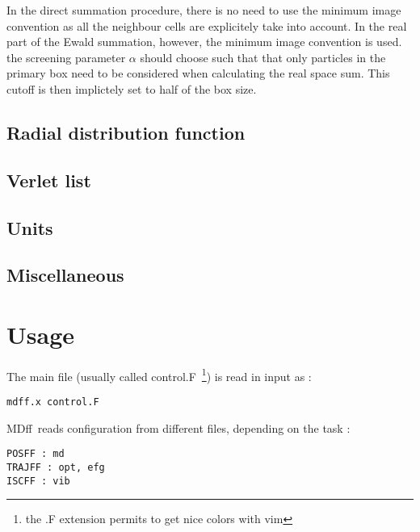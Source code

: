 \documentclass[a4paper]{article}
\newcommand{\MDFF}{{\sc MDff}}
\begin{document}
In the direct summation procedure, there is no need to use the minimum
 image convention as all the neighbour cells are explicitely take into account.
In the real part of the Ewald summation, however, the minimum image convention
is used. the screening parameter $\alpha$ should choose such that that only particles
in the primary box need to be considered when calculating the real space sum.
This cutoff is then implictely set to half of the box size.


\subsection{Radial distribution function\label{sec:GR}}

\subsection{Verlet list\label{sec:vnlist}}

\subsection{Units \label{sec:units}}

\subsection{Miscellaneous \label{sec:misc}}

\section{Usage}

The main file (usually called control.F~\footnote{the .F extension permits to get nice colors with vim}) is read in input as :
\begin{verbatim}
mdff.x control.F
\end{verbatim}

\MDFF~reads configuration from different files, depending on the task :
\begin{verbatim}
POSFF : md
TRAJFF : opt, efg
ISCFF : vib
\end{verbatim}
\end{document}
